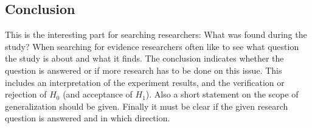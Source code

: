 
\subsection{Conclusion}
\label{subsec:conclusion}

This is the interesting part for searching researchers: What was found during the study? When searching for evidence researchers often like to see what question the study is about and what it finds. The conclusion indicates whether the question is answered or if more research has to be done on this issue. This includes an interpretation of the experiment results, and the verification or rejection of $H_0$ (and acceptance of $H_1$). Also a short statement on the scope of generalization should be given. Finally it must be clear if the given research question is answered and in which direction.